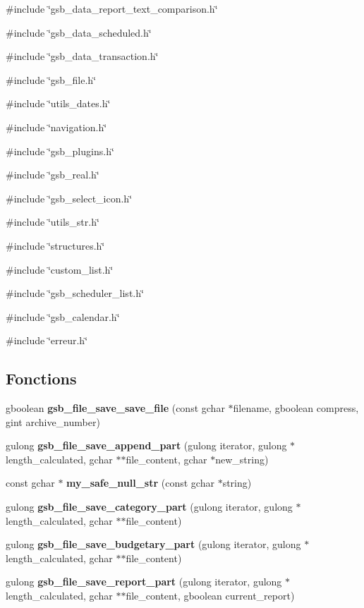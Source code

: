 {\ttfamily \#include \char`\"{}gsb\_\-data\_\-report\_\-text\_\-comparison.h\char`\"{}}\par
{\ttfamily \#include \char`\"{}gsb\_\-data\_\-scheduled.h\char`\"{}}\par
{\ttfamily \#include \char`\"{}gsb\_\-data\_\-transaction.h\char`\"{}}\par
{\ttfamily \#include \char`\"{}gsb\_\-file.h\char`\"{}}\par
{\ttfamily \#include \char`\"{}utils\_\-dates.h\char`\"{}}\par
{\ttfamily \#include \char`\"{}navigation.h\char`\"{}}\par
{\ttfamily \#include \char`\"{}gsb\_\-plugins.h\char`\"{}}\par
{\ttfamily \#include \char`\"{}gsb\_\-real.h\char`\"{}}\par
{\ttfamily \#include \char`\"{}gsb\_\-select\_\-icon.h\char`\"{}}\par
{\ttfamily \#include \char`\"{}utils\_\-str.h\char`\"{}}\par
{\ttfamily \#include \char`\"{}structures.h\char`\"{}}\par
{\ttfamily \#include \char`\"{}custom\_\-list.h\char`\"{}}\par
{\ttfamily \#include \char`\"{}gsb\_\-scheduler\_\-list.h\char`\"{}}\par
{\ttfamily \#include \char`\"{}gsb\_\-calendar.h\char`\"{}}\par
{\ttfamily \#include \char`\"{}erreur.h\char`\"{}}\par
\subsection*{Fonctions}
\begin{DoxyCompactItemize}
\item 
gboolean {\bf gsb\_\-file\_\-save\_\-save\_\-file} (const gchar $\ast$filename, gboolean compress, gint archive\_\-number)
\item 
gulong {\bf gsb\_\-file\_\-save\_\-append\_\-part} (gulong iterator, gulong $\ast$length\_\-calculated, gchar $\ast$$\ast$file\_\-content, gchar $\ast$new\_\-string)
\item 
const gchar $\ast$ {\bf my\_\-safe\_\-null\_\-str} (const gchar $\ast$string)
\item 
gulong {\bf gsb\_\-file\_\-save\_\-category\_\-part} (gulong iterator, gulong $\ast$length\_\-calculated, gchar $\ast$$\ast$file\_\-content)
\item 
gulong {\bf gsb\_\-file\_\-save\_\-budgetary\_\-part} (gulong iterator, gulong $\ast$length\_\-calculated, gchar $\ast$$\ast$file\_\-content)
\item 
gulong {\bf gsb\_\-file\_\-save\_\-report\_\-part} (gulong iterator, gulong $\ast$length\_\-calculated, gchar $\ast$$\ast$file\_\-content, gboolean current\_\-report)
\end{DoxyCompactItemize}
